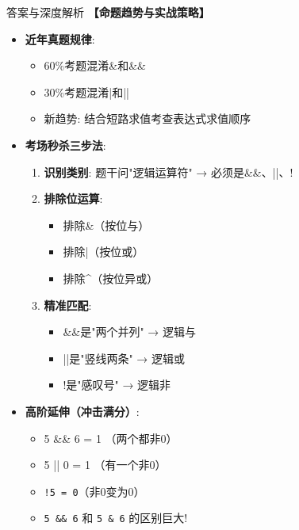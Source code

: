 \documentclass[a4paper,12pt]{article}
\begin{document}
\begin{bluebox}{答案与深度解析}
	\textbf{【命题趋势与实战策略】}
	\begin{itemize}[leftmargin=*, nosep]
		\item \textbf{近年真题规律}:
		      \begin{itemize}
			      \item 60\%考题混淆\&和\&\&
			      \item 30\%考题混淆|和||
			      \item 新趋势: 结合短路求值考查表达式求值顺序
		      \end{itemize}

		\item \textbf{考场秒杀三步法}:
		      \begin{enumerate}
			      \item \textbf{识别类别}: 题干问"逻辑运算符" → 必须是\&\&、||、!
			      \item \textbf{排除位运算}:
			            \begin{itemize}
				            \item 排除\&（按位与）
				            \item 排除|（按位或）
				            \item 排除\^{}（按位异或）
			            \end{itemize}
			      \item \textbf{精准匹配}:
			            \begin{itemize}
				            \item \&\&是"两个并列" → 逻辑与
				            \item ||是"竖线两条" → 逻辑或
				            \item !是"感叹号" → 逻辑非
			            \end{itemize}
		      \end{enumerate}

		\item \textbf{高阶延伸（冲击满分）}:
		      \begin{itemize}
			      \item 5 \&\& 6 = 1 （两个都非0）
			      \item 5 || 0 = 1 （有一个非0）
			      \item \texttt{!5 = 0}（非0变为0）
			      \item \texttt{5 \&\& 6} 和 \texttt{5 \& 6} 的区别巨大!
		      \end{itemize}
	\end{itemize}
\end{bluebox}
\end{document}
